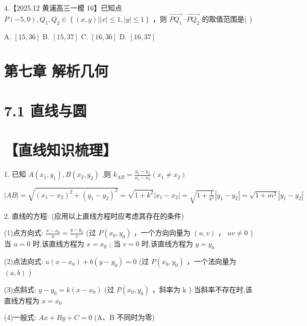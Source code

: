\documentclass[10pt]{article}
\begin{document}
4.【2025.12 黄浦高三一模 16】已知点 \(P\left( {-5,0}\right) ,{Q}_{1},{Q}_{2} \in  \left\{  {\left( {x,y}\right) \left| \right| x\left| { \leq  1,}\right| y \mid   \leq  1}\right\}\) ，则 \(\overrightarrow{P{Q}_{1}} \cdot  \overrightarrow{P{Q}_{2}}\) 的取值范围是( )

A. \(\left\lbrack  {{15},{36}}\right\rbrack\) B. \(\left\lbrack  {{15},{37}}\right\rbrack\) C. \(\left\lbrack  {{16},{36}}\right\rbrack\) D. \(\left\lbrack  {{16},{37}}\right\rbrack\)

\section*{第七章 解析几何}

\section*{7.1 直线与圆}

\section*{【直线知识梳理】}

1. 已知 \(A\left( {{x}_{1},{y}_{1}}\right) ,B\left( {{x}_{2},{y}_{2}}\right)\) ,则 \({k}_{AB} = \frac{{y}_{1} - {y}_{2}}{{x}_{1} - {x}_{2}}\left( {{x}_{1} \neq  {x}_{2}}\right)\)

\(\left| {AB}\right|  = \sqrt{{\left( {x}_{1} - {x}_{2}\right) }^{2} + {\left( {y}_{1} - {y}_{2}\right) }^{2}} = \sqrt{1 + {k}^{2}}\left| {{x}_{1} - {x}_{2}}\right|  = \sqrt{1 + \frac{1}{{k}^{2}}}\left| {{y}_{1} - {y}_{2}}\right|  = \sqrt{1 + {m}^{2}}\left| {{y}_{1} - {y}_{2}}\right|\)

2. 直线的方程: (应用以上直线方程时应考虑其存在的条件)

(1)点方向式: \(\frac{x - {x}_{0}}{u} = \frac{y - {y}_{0}}{v}\) (过 \(P\left( {{x}_{0},{y}_{0}}\right)\) ，一个方向向量为 \(\left( {u,v}\right)\) ， \({uv} \neq  0\) ) 当 \(u = 0\) 时,该直线方程为 \(x = {x}_{0}\) ; 当 \(v = 0\) 时,该直线方程为 \(y = {y}_{0}\)

(2)点法向式: \(a\left( {x - {x}_{0}}\right)  + b\left( {y - {y}_{0}}\right)  = 0\) (过 \(P\left( {{x}_{0},{y}_{0}}\right)\) ，一个法向量为 \(\left( {a,b}\right)\) )

(3)点斜式: \(y - {y}_{0} = k\left( {x - {x}_{0}}\right)\) (过 \(P\left( {{x}_{0},{y}_{0}}\right)\) ，斜率为 \(\mathrm{k}\) ) 当斜率不存在时,该直线方程为 \(x = {x}_{0}\)

(4)一般式: \({Ax} + {By} + C = 0\) (A、B 不同时为零)
\end{document}
